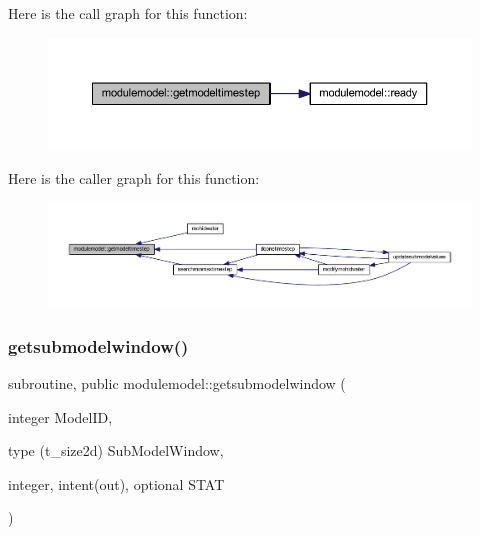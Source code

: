 Here is the call graph for this function\+:\nopagebreak
\begin{figure}[H]
\begin{center}
\leavevmode
\includegraphics[width=350pt]{namespacemodulemodel_a548beb7d8ae7799facee13efde759d64_cgraph}
\end{center}
\end{figure}
Here is the caller graph for this function\+:\nopagebreak
\begin{figure}[H]
\begin{center}
\leavevmode
\includegraphics[width=350pt]{namespacemodulemodel_a548beb7d8ae7799facee13efde759d64_icgraph}
\end{center}
\end{figure}
\mbox{\label{namespacemodulemodel_a61debfb6b3b629e1cd4bbdfe3c1c1ad1}} 
\subsubsection{\texorpdfstring{getsubmodelwindow()}{getsubmodelwindow()}}
{\footnotesize\ttfamily subroutine, public modulemodel\+::getsubmodelwindow (\begin{DoxyParamCaption}\item[{integer}]{Model\+ID,  }\item[{type (t\+\_\+size2d)}]{Sub\+Model\+Window,  }\item[{integer, intent(out), optional}]{S\+T\+AT }\end{DoxyParamCaption})}

